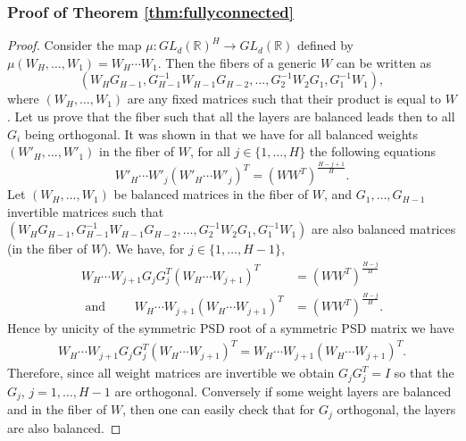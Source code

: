 \documentclass[twoside]{article}
\theoremstyle{definition}
\theoremstyle{remark}
\begin{document}
\subsubsection{Proof of Theorem \ref{thm:fullyconnected}}
\begin{proof}
    Consider the map $\mu: GL_d(\mathbb{R})^H \to GL_d(\mathbb{R})$ defined by $\mu(W_H,\ldots,W_1) = W_H \cdots W_1$. Then the fibers of a generic $W$ can be written as $$(W_HG_{H-1},G_{H-1}^{-1}W_{H-1}G_{H-2},\ldots,G_{2}^{-1}W_{2}G_{1},G_{1}^{-1}W_{1}),$$ where $(W_H, \ldots, W_1)$ are any fixed matrices such that their product is equal to $W$.
Let us prove that the fiber such that all the layers are balanced leads then to all $G_i$ being orthogonal. It was shown in \cite{arora2018optimization} that we have for all balanced weights $(W'_H,\ldots,W'_1)$ in the fiber of $W$, for all $j \in \{1,\ldots,H\}$ the following equations $$ W'_H \cdots W'_j (W'_H \cdots W'_j)^T = (WW^T)^{\frac{H-j+1}{H}}.$$
Let $(W_H,\ldots,W_1)$ be balanced matrices in the fiber of $W$, and $G_1,\ldots,G_{H-1}$ invertible matrices such that $(W_HG_{H-1},G_{H-1}^{-1}W_{H-1}G_{H-2},\ldots,G_{2}^{-1}W_{2}G_{1},G_{1}^{-1}W_{1})$ are also balanced matrices (in the fiber of $W$).
We have, for  $j \in \{1,\ldots,H-1\}$,
\begin{align*}
    W_H \cdots W_{j+1} G_j G_j^T (W_H \cdots W_{j+1})^T & = (WW^T)^{\frac{H-j}{H}} \\ 
    \text{ and } \quad\quad W_H \cdots W_{j+1} (W_H \cdots W_{j+1})^T & =(WW^T)^{\frac{H-j}{H}}.
\end{align*}
Hence by unicity of the symmetric PSD root of a symmetric PSD matrix we have \begin{align*}
    W_H \cdots W_{j+1} G_j G_j^T (W_H \cdots W_{j+1})^T = W_H \cdots W_{j+1} (W_H \cdots W_{j+1})^T.
\end{align*} 
Therefore, since all weight matrices are invertible we obtain $G_jG_j^T=I$ so that the $G_j$, $j=1,\hdots,H-1$ are orthogonal. Conversely if some weight layers are balanced and in the fiber of $W$, then one can easily check that for $G_j$ orthogonal, the layers are also balanced.
\end{proof}
\end{document}
